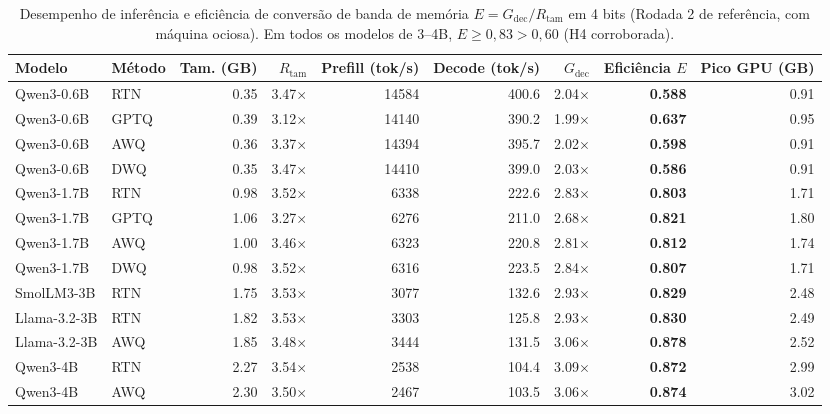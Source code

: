 \begin{table}[htbp]
\centering
\caption{Desempenho de inferência e eficiência de conversão de banda de memória $E = G_{\text{dec}}/R_{\text{tam}}$ em 4 bits (Rodada 2 de referência, com máquina ociosa). Em todos os modelos de 3--4B, $E \ge 0{,}83 > 0{,}60$ (H4 corroborada).}
\label{tab:velocidade_h4}
\small
\begin{tabular}{llrrrrrrr}
\toprule
Modelo & Método & Tam. (GB) & $R_{\text{tam}}$ & Prefill (tok/s) & Decode (tok/s) & $G_{\text{dec}}$ & Eficiência $E$ & Pico GPU (GB) \\
\midrule
Qwen3-0.6B & RTN & 0.35 & 3.47$\times$ & 14584 & 400.6 & 2.04$\times$ & \textbf{0.588} & 0.91 \\
Qwen3-0.6B & GPTQ & 0.39 & 3.12$\times$ & 14140 & 390.2 & 1.99$\times$ & \textbf{0.637} & 0.95 \\
Qwen3-0.6B & AWQ & 0.36 & 3.37$\times$ & 14394 & 395.7 & 2.02$\times$ & \textbf{0.598} & 0.91 \\
Qwen3-0.6B & DWQ & 0.35 & 3.47$\times$ & 14410 & 399.0 & 2.03$\times$ & \textbf{0.586} & 0.91 \\
Qwen3-1.7B & RTN & 0.98 & 3.52$\times$ & 6338 & 222.6 & 2.83$\times$ & \textbf{0.803} & 1.71 \\
Qwen3-1.7B & GPTQ & 1.06 & 3.27$\times$ & 6276 & 211.0 & 2.68$\times$ & \textbf{0.821} & 1.80 \\
Qwen3-1.7B & AWQ & 1.00 & 3.46$\times$ & 6323 & 220.8 & 2.81$\times$ & \textbf{0.812} & 1.74 \\
Qwen3-1.7B & DWQ & 0.98 & 3.52$\times$ & 6316 & 223.5 & 2.84$\times$ & \textbf{0.807} & 1.71 \\
SmolLM3-3B & RTN & 1.75 & 3.53$\times$ & 3077 & 132.6 & 2.93$\times$ & \textbf{0.829} & 2.48 \\
Llama-3.2-3B & RTN & 1.82 & 3.53$\times$ & 3303 & 125.8 & 2.93$\times$ & \textbf{0.830} & 2.49 \\
Llama-3.2-3B & AWQ & 1.85 & 3.48$\times$ & 3444 & 131.5 & 3.06$\times$ & \textbf{0.878} & 2.52 \\
Qwen3-4B & RTN & 2.27 & 3.54$\times$ & 2538 & 104.4 & 3.09$\times$ & \textbf{0.872} & 2.99 \\
Qwen3-4B & AWQ & 2.30 & 3.50$\times$ & 2467 & 103.5 & 3.06$\times$ & \textbf{0.874} & 3.02 \\
\bottomrule
\end{tabular}
\end{table}
